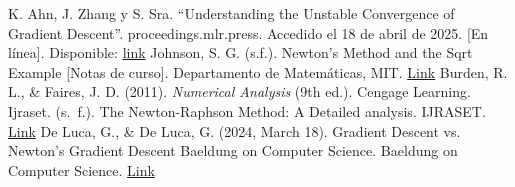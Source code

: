 \documentclass[conference]{IEEEtran}
\begin{document}
\begin{thebibliography}{1}
K. Ahn, J. Zhang y S. Sra. “Understanding the Unstable Convergence of Gradient Descent”. proceedings.mlr.press. Accedido el 18 de abril de 2025. [En línea]. Disponible: 
\href{https://proceedings.mlr.press/v162/ahn22a/ahn22a.pdf}{link}
Johnson, S. G. (s.f.). Newton's Method and the Sqrt Example [Notas de curso]. Departamento de Matemáticas, MIT.
\href{https://math.mit.edu/~stevenj/18.335/newton-sqrt.pdf}{Link}
Burden, R. L., \& Faires, J. D. (2011). \textit{Numerical Analysis} (9th ed.). Cengage Learning.
Ijraset. (s. f.). The Newton-Raphson Method: A Detailed analysis. IJRASET.
\href{https://www.ijraset.com/research-paper/newton-raphson-method-a-detailed-analysis}{Link}
De Luca, G.,  \& De Luca, G. (2024, March 18). Gradient Descent vs. Newton’s Gradient Descent Baeldung on Computer Science. Baeldung on Computer Science. 
\href{https://www.baeldung.com/cs/gradient-descent-vs-newtons-gradient-descent}{Link}
\end{thebibliography}
\end{document}
